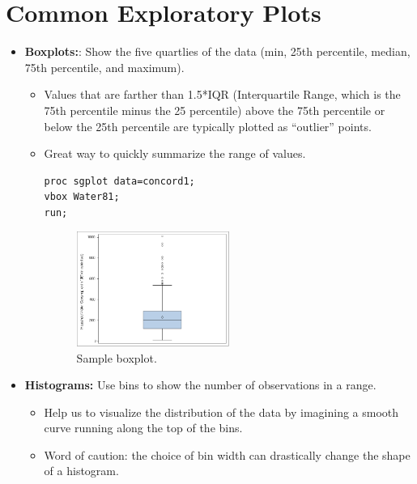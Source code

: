 \documentclass[12pt]{../notes}
\begin{document}
\section{Common Exploratory Plots}
\begin{itemize}
\item \textbf{Boxplots:}: Show the five quartlies of the data (min, 25th percentile, median, 75th percentile, and maximum). 
\begin{itemize}
\item Values that are farther than 1.5*IQR (Interquartile Range, which is the 75th percentile minus the 25 percentile) above the 75th percentile or below the 25th percentile are typically plotted as ``outlier'' points. 
\item Great way to quickly summarize the range of values.

\begin{verbatim}
proc sgplot data=concord1;
vbox Water81;
run;
\end{verbatim}

\begin{minipage}[l][1cm][c]{\textwidth}
\end{minipage}

\begin{figure}[H]
\centering
\includegraphics[width = 0.5\textwidth]{../figures/module1/sampBox.png}
\caption{Sample boxplot.}
\end{figure}

\end{itemize}
\item \textbf{Histograms:} Use bins to show the number of observations in a range. 
\begin{itemize}
\item Help us to visualize the distribution of the data by imagining a smooth curve running along the top of the bins. 
\item Word of caution: the choice of bin width can drastically change the shape of a histogram. 
\end{itemize}


\end{itemize}
\end{document}
